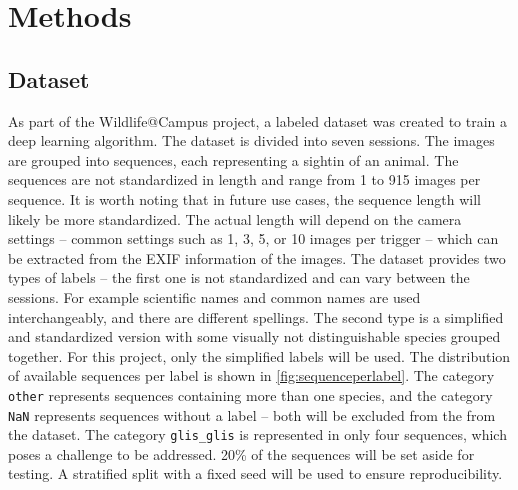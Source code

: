 

\section{Methods}
\label{methods}

    \subsection{Dataset}

    As part of the Wildlife@Campus project, a labeled dataset was created to train a deep learning algorithm.
    The dataset is divided into seven sessions.
    The images are grouped into sequences, each representing a sightin of an animal.
    The sequences are not standardized in length and range from 1 to 915 images per sequence.
    It is worth noting that in future use cases, the sequence length will likely be more standardized.
    The actual length will depend on the camera settings -- common settings such as 1, 3, 5, or 10 images per trigger -- which can be extracted from the EXIF information of the images.
    The dataset provides two types of labels -- the first one is not standardized and can vary between the sessions.
    For example scientific names and common names are used interchangeably, and there are different spellings.
    The second type is a simplified and standardized version with some visually not distinguishable species grouped together.
    For this project, only the simplified labels will be used.
    The distribution of available sequences per label is shown in \autoref{fig:sequenceperlabel}.
    The category \texttt{other} represents sequences containing more than one species, and the category \texttt{NaN} represents sequences without a label -- both will be excluded from the from the dataset.
    The category \texttt{glis\_glis} is represented in only four sequences, which poses a challenge to be addressed.
    20\% of the sequences will be set aside for testing.
    A stratified split with a fixed seed will be used to ensure reproducibility.

